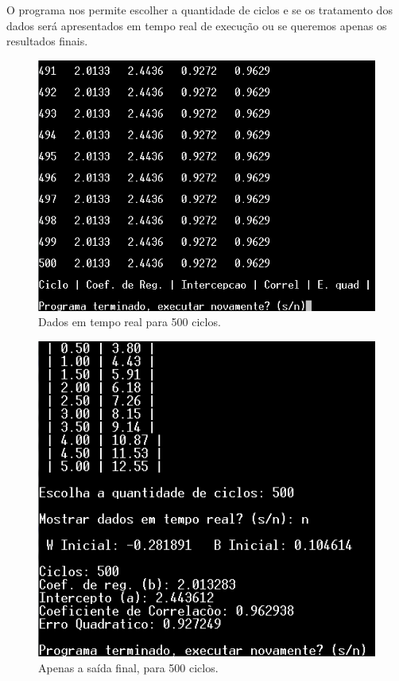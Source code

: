 O programa nos permite escolher a quantidade de ciclos e se os tratamento dos dados será apresentados em tempo real de execução ou se queremos apenas os resultados finais.

\begin{figure}[H]
	\center
	\includegraphics[scale =0.9]{imagens/real.png}
	\caption{Dados em tempo real para 500 ciclos.}
\end{figure}

\begin{figure}[H]
	\center
	\includegraphics[scale =1]{imagens/estat.png}
	\caption{Apenas a saída final, para 500 ciclos.}
\end{figure}


